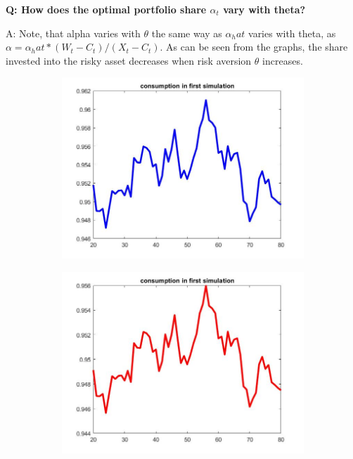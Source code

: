 \documentclass[12pt,a4paper]{article}
\begin{document}
\textbf{Q: How does the optimal portfolio share $\alpha_t$ vary with theta? }

A: Note, that alpha varies with $\theta$ the same way as $\alpha_hat$ varies with theta, as $\alpha = \alpha_hat * (W_t - C_t)/ (X_t - C_t)$. As can be seen from the graphs, the share invested into the risky asset decreases when risk aversion $\theta$ increases.

\begin{figure}[h!]
  \centering
  \begin{subfigure}[b]{0.32\linewidth}
    \includegraphics[width=\linewidth]{graphs/Q2/cons.jpg}
  \end{subfigure}
  \begin{subfigure}[b]{0.32\linewidth}
      \includegraphics[width=\linewidth]{graphs/Q2/cons2.jpg}

\end{subfigure}
\end{figure}
\end{document}
